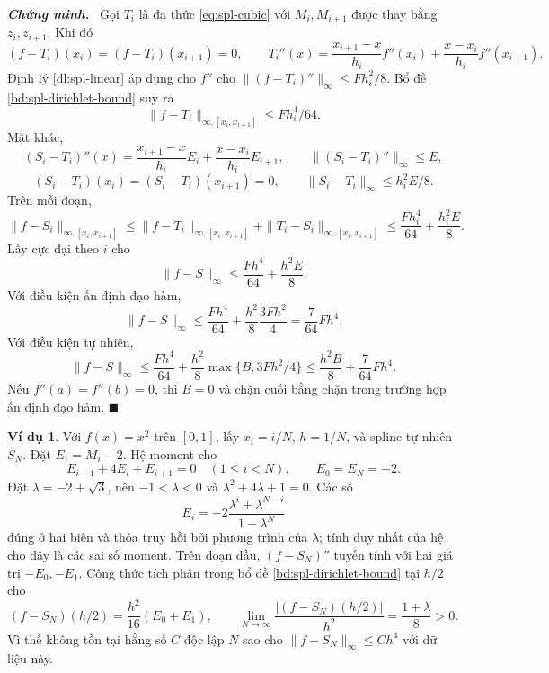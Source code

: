 \documentclass[12pt,a4paper,oneside]{book}
\numberwithin{algorithm}{chapter}
\theoremstyle{definition}
\newtheorem{vidu}{Ví dụ}[chapter]
\newenvironment{chungminh}{\par\medskip\noindent\textbf{\textit{\color{mainblue}Chứng minh.}}\ }{\hfill$\blacksquare$\par\medskip}
\begin{document}
\begin{chungminh}
Gọi $T_i$ là đa thức \eqref{eq:spl-cubic} với $M_i,M_{i+1}$ được thay bằng $z_i,z_{i+1}$. Khi đó
\[
 (f-T_i)(x_i)=(f-T_i)(x_{i+1})=0,\qquad
 T_i''(x)=\frac{x_{i+1}-x}{h_i}f''(x_i)+\frac{x-x_i}{h_i}f''(x_{i+1}).
\]
Định lý \ref{dl:spl-linear} áp dụng cho $f''$ cho $\|(f-T_i)''\|_\infty\leq Fh_i^2/8$. Bổ đề \ref{bd:spl-dirichlet-bound} suy ra
\[
 \|f-T_i\|_{\infty,[x_i,x_{i+1}]}\leq Fh_i^4/64.
\]
Mặt khác,
\[
 (S_i-T_i)''(x)=\frac{x_{i+1}-x}{h_i}E_i+\frac{x-x_i}{h_i}E_{i+1},\qquad
 \|(S_i-T_i)''\|_\infty\leq E,
\]
\[
 (S_i-T_i)(x_i)=(S_i-T_i)(x_{i+1})=0,\qquad
 \|S_i-T_i\|_\infty\leq h_i^2E/8.
\]
Trên mỗi đoạn,
\[
 \|f-S_i\|_{\infty,[x_i,x_{i+1}]}
 \leq\|f-T_i\|_{\infty,[x_i,x_{i+1}]}
   +\|T_i-S_i\|_{\infty,[x_i,x_{i+1}]}
 \leq\frac{Fh_i^4}{64}+\frac{h_i^2E}8.
\]
Lấy cực đại theo $i$ cho
\[
 \|f-S\|_\infty\leq\frac{Fh^4}{64}+\frac{h^2E}8.
\]
Với điều kiện ấn định đạo hàm,
\[
 \|f-S\|_\infty
 \leq\frac{Fh^4}{64}+\frac{h^2}8\frac{3Fh^2}4
 =\frac7{64}Fh^4.
\]
Với điều kiện tự nhiên,
\[
 \|f-S\|_\infty
 \leq\frac{Fh^4}{64}+\frac{h^2}8\max\{B,3Fh^2/4\}
 \leq\frac{h^2B}8+\frac7{64}Fh^4.
\]
Nếu $f''(a)=f''(b)=0$, thì $B=0$ và chặn cuối bằng chặn trong trường hợp ấn định đạo hàm.
\end{chungminh}
\begin{vidu}
Với $f(x)=x^2$ trên $[0,1]$, lấy $x_i=i/N$, $h=1/N$, và spline tự nhiên $S_N$. Đặt $E_i=M_i-2$. Hệ moment cho
\[
 E_{i-1}+4E_i+E_{i+1}=0\quad(1\leq i<N),\qquad E_0=E_N=-2.
\]
Đặt $\lambda=-2+\sqrt3$, nên $-1<\lambda<0$ và $\lambda^2+4\lambda+1=0$. Các số
\[
 E_i=-2\frac{\lambda^i+\lambda^{N-i}}{1+\lambda^N}
\]
đúng ở hai biên và thỏa truy hồi bởi phương trình của $\lambda$; tính duy nhất của hệ cho đây là các sai số moment. Trên đoạn đầu, $(f-S_N)''$ tuyến tính với hai giá trị $-E_0,-E_1$. Công thức tích phân trong bổ đề \ref{bd:spl-dirichlet-bound} tại $h/2$ cho
\[
 (f-S_N)(h/2)=\frac{h^2}{16}(E_0+E_1),\qquad
 \lim_{N\to\infty}\frac{|(f-S_N)(h/2)|}{h^2}=\frac{1+\lambda}8>0.
\]
Vì thế không tồn tại hằng số $C$ độc lập $N$ sao cho $\|f-S_N\|_\infty\leq Ch^4$ với dữ liệu này.
\end{vidu}

\end{document}
